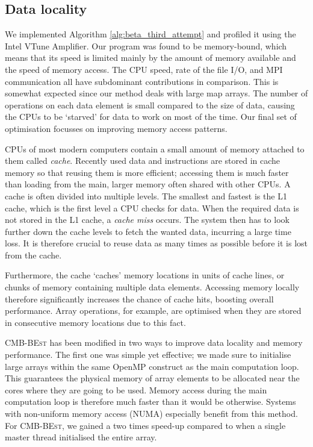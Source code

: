 \subsection{Data locality}

We implemented Algorithm \ref{alg:beta_third_attempt} and profiled it using the Intel VTune Amplifier. Our program was found to be memory-bound, which means that its speed is limited mainly by the amount of memory available and the speed of memory access. The CPU speed, rate of the file I/O, and MPI communication all have subdominant contributions in comparison. This is somewhat expected since our method deals with large map arrays. The number of operations on each data element is small compared to the size of data, causing the CPUs to be `starved' for data to work on most of the time. Our final set of optimisation focusses on improving memory access patterns.

CPUs of most modern computers contain a small amount of memory attached to them called \textit{cache}. Recently used data and instructions are stored in cache memory so that reusing them is more efficient; accessing them is much faster than loading from the main, larger memory often shared with other CPUs. A cache is often divided into multiple levels. The smallest and fastest is the L1 cache, which is the first level a CPU checks for data. When the required data is not stored in the L1 cache, a \textit{cache miss} occurs. The system then has to look further down the cache levels to fetch the wanted data, incurring a large time loss. It is therefore crucial to reuse data as many times as possible before it is lost from the cache.

Furthermore, the cache `caches' memory locations in units of cache lines, or chunks of memory containing multiple data elements. Accessing memory locally therefore significantly increases the chance of cache hits, boosting overall performance. Array operations, for example, are optimised when they are stored in consecutive memory locations due to this fact.

\textsc{CMB-BEst} has been modified in two ways to improve data locality and memory performance. The first one was simple yet effective; we made sure to initialise large arrays within the same OpenMP construct as the main computation loop. This guarantees the physical memory of array elements to be allocated near the cores where they are going to be used. Memory access during the main computation loop is therefore much faster than it would be otherwise. Systems with non-uniform memory access (NUMA) especially benefit from this method. For \textsc{CMB-BEst}, we gained a two times speed-up compared to when a single master thread initialised the entire array.

